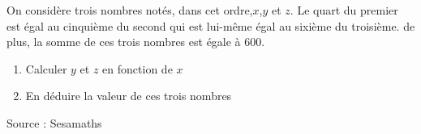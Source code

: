 
On considère trois nombres notés, dans cet ordre,$x$,$y$ et $z$. Le quart du premier est égal au cinquième du second qui est lui-même égal au sixième du troisième. de plus, la somme de ces trois nombres est égale à $600$.
\begin{enumerate}
\item Calculer $y$ et $z$ en fonction de $x$
\item En déduire la valeur de ces trois nombres
\end{enumerate}  

\hfill{{\scriptsize Source : Sesamaths}}